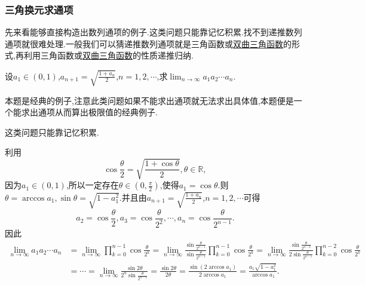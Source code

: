 \documentclass[../../main.tex]{subfiles}%
\begin{document}
\subsubsection{三角换元求通项}

先来看能够直接构造出数列通项的例子.这类问题只能靠记忆积累.找不到递推数列通项就很难处理.一般我们可以猜递推数列通项就是三角函数或\href{https://baike.baidu.com/item/%E5%8F%8C%E6%9B%B2%E5%87%BD%E6%95%B0/8704306}{双曲三角函数}的形式,再利用三角函数或\href{https://baike.baidu.com/item/%E5%8F%8C%E6%9B%B2%E5%87%BD%E6%95%B0/8704306}{双曲三角函数}的性质递推归纳.

\begin{example}\label{example:例题3.82}
设\(a_1\in(0,1)\),\(a_{n + 1}=\sqrt{\frac{1 + a_n}{2}}\),\(n = 1,2,\cdots\),求\(\lim_{n\rightarrow\infty}a_1a_2\cdots a_n\).
\end{example}
\begin{note}
本题是经典的例子,注意此类问题如果不能求出通项就无法求出具体值,本题便是一个能求出通项从而算出极限值的经典例子.
\end{note}
\begin{remark}
这类问题只能靠记忆积累.
\end{remark}
\begin{solution}

利用
\[
\cos\frac{\theta}{2}=\sqrt{\frac{1 + \cos\theta}{2}},\theta\in\mathbb{R},
\]
因为$a_1\in (0,1)$,所以一定存在$\theta\in(0,\frac{\pi}{2})$,使得\(a_1=\cos\theta\).则$\theta=\arccos a_1,\sin\theta=\sqrt{1-a_1^2}$.并且由\(a_{n + 1}=\sqrt{\frac{1 + a_n}{2}}\),\(n = 1,2,\cdots\)可得
\[
a_2=\cos\frac{\theta}{2},a_3=\cos\frac{\theta}{2^2},\cdots,a_n=\cos\frac{\theta}{2^{n - 1}}.
\]
因此
\begin{align*}
\lim_{n\rightarrow\infty}a_1a_2\cdots a_n&=\lim_{n\rightarrow\infty}\prod_{k = 0}^{n - 1}\cos\frac{\theta}{2^k}=\lim_{n\rightarrow\infty}\frac{\sin\frac{\theta}{2^{n - 1}}}{\sin\frac{\theta}{2^{n - 1}}}\prod_{k = 0}^{n - 1}\cos\frac{\theta}{2^k}=\lim_{n\rightarrow\infty}\frac{\sin\frac{\theta}{2^{n - 2}}}{2\sin\frac{\theta}{2^{n - 1}}}\prod_{k = 0}^{n - 2}\cos\frac{\theta}{2^k}\\
&=\cdots=\lim_{n\rightarrow\infty}\frac{\sin2\theta}{2^n\sin\frac{\theta}{2^{n - 1}}}=\frac{\sin2\theta}{2\theta}=\frac{\sin(2\arccos a_1)}{2\arccos a_1}=\frac{a_1\sqrt{1 - a_1^2}}{\arccos a_1}.
\end{align*}

\end{solution}
\end{document}
